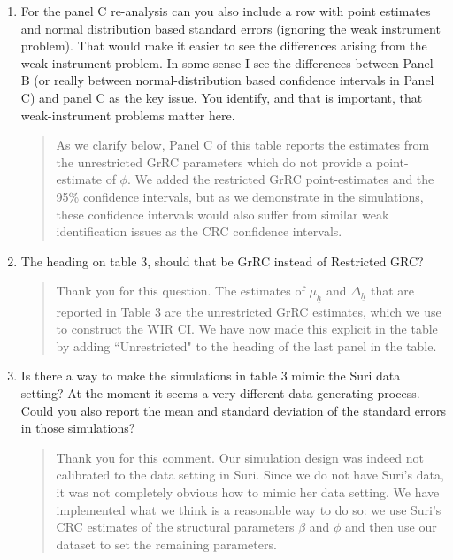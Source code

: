 \documentclass{article}[11pt]
\begin{document}
\begin{enumerate}
\item For the panel C re-analysis can you also include a row with point estimates and normal distribution based standard errors (ignoring the weak instrument problem). That would make it easier to see the differences arising from the weak instrument problem. In some sense I see the differences between Panel B (or really between normal-distribution based confidence intervals in Panel C) and panel C as the key issue. You identify, and that is important, that weak-instrument problems matter here.
\begin{quote}
   As we clarify below, Panel C of this table reports the estimates from the unrestricted GrRC parameters which do not provide a point-estimate of $\phi$. We added the restricted GrRC point-estimates and the 95\% confidence intervals, but as we demonstrate in the simulations, these confidence intervals would also suffer from similar weak identification issues as the CRC confidence intervals.
\end{quote}
\item The heading on table 3, should that be GrRC instead of Restricted GRC?
\begin{quote}
     Thank you for this question. The estimates of $\mu_{\underline{h}}$ and $\Delta_{\underline{h}}$ that are reported in Table 3 are the unrestricted GrRC estimates, which we use to construct the WIR CI. We have now made this explicit in the table by adding ``Unrestricted" to the heading of the last panel in the table. 
\end{quote}
\item Is there a way to make the simulations in table 3 mimic the Suri data setting? At the moment it seems a very different data generating process. Could you also report the mean and standard deviation of the standard errors in those simulations?
\begin{quote}
    Thank you for this comment. Our simulation design was indeed not calibrated to the data setting in Suri. Since we do not have Suri's data, it was not completely obvious how to mimic her data setting. We have implemented what we think is a reasonable way to do so: we use Suri's CRC estimates of the structural parameters $\beta$ and $\phi$ and then use our dataset to set the remaining parameters.


\end{quote}
\end{enumerate}
\end{document}
